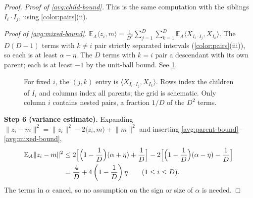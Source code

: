 \documentclass[11pt]{article}
\newcommand{\norm}[1]{\lVert #1\rVert}
\newcommand{\ip}[2]{\langle #1,#2\rangle}
\theoremstyle{definition}
\numberwithin{equation}{section}
\newcommand{\step}[1]{\par\smallskip\noindent\textbf{Step #1.}\enspace}
\newcommand{\EA}{\mathbb E_A}
\begin{document}
\begin{proof}
\emph{Proof of \eqref{avg:child-bound}.} This is the same computation with
the siblings \(I_i\cdot I_j\), using \cref{color:pairs}(ii).

\emph{Proof of \eqref{avg:mixed-bound}.}
\(\EA\ip{z_i}{m}=\frac1{D^2}\sum_{j=1}^D\sum_{k=1}^D
\EA\ip{X_{I_i\cdot I_j}}{X_{I_k}}\).
The \(D(D-1)\) terms with \(k\ne i\) pair strictly separated intervals
(\cref{color:pairs}(iii)), so each is at least \(\alpha-\eta\). The
\(D\) terms with \(k=i\) pair a descendant with its own parent; each is
at least \(-1\) by the unit-ball bound. See \cref{fig:mixed-pairs}.

\begin{figure}[tbp]
\centering
{}
\caption{For fixed \(i\), the \((j,k)\) entry is
\(\ip{X_{I_i\cdot I_j}}{X_{I_k}}\). Rows index the children of
\(I_i\) and columns index all parents; the grid is schematic.
Only column \(i\) contains nested pairs, a fraction \(1/D\) of the
\(D^2\) terms.}
\label{fig:mixed-pairs}
\end{figure}

\step{6 (variance estimate)}
Expanding
\(\norm{z_i-m}^2=\norm{z_i}^2-2\ip{z_i}{m}+\norm m^2\) and inserting
\eqref{avg:parent-bound}--\eqref{avg:mixed-bound},
\begin{align}
  \EA\norm{z_i-m}^2
  &\le2\Bigl[\Bigl(1-\frac1D\Bigr)(\alpha+\eta)+\frac1D\Bigr]
     -2\Bigl[\Bigl(1-\frac1D\Bigr)(\alpha-\eta)-\frac1D\Bigr]\notag\\
  &=\frac4D+4\left(1-\frac1D\right)\eta
    \qquad(1\le i\le D).\label{avg:variance}
\end{align}
The terms in \(\alpha\) cancel, so no assumption on the sign or size of
\(\alpha\) is needed.


\end{proof}
\end{document}
